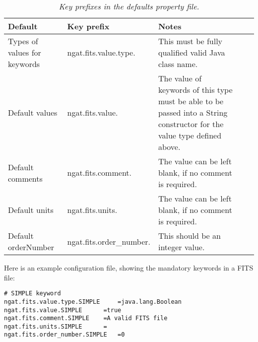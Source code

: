\documentclass[10pt,a4paper]{article}
\begin{document}
\begin{table}
\begin{center}
\begin{tabular}{|l|l|p{12em}|l|p{17em}|}
\hline
{\bf Default} 			& {\bf Key prefix} 	& {\bf Notes} \\ \hline
Types of values for keywords	& ngat.fits.value.type. & This must be fully qualified valid Java class name. \\ \hline
Default values 			& ngat.fits.value. 	& The value of keywords of this type must be able to be 
					passed into a String constructor for the value type defined above. \\ \hline
Default comments 		& ngat.fits.comment. 	& The value can be left blank, 
							if no comment is required. \\ \hline
Default units 			& ngat.fits.units. 	& The value can be left blank, 
							if no comment is required. \\ \hline
Default orderNumber 		& ngat.fits.order\_number. & This should be an integer value. \\ \hline
\end{tabular}
\end{center}
\caption{\em Key prefixes in the defaults property file.}
\label{tab:defaultkeyprefix} 
\end{table}

Here is an example configuration file, showing the mandatory keywords in a FITS file:

\begin{verbatim}
# SIMPLE keyword
ngat.fits.value.type.SIMPLE 	=java.lang.Boolean
ngat.fits.value.SIMPLE 		=true
ngat.fits.comment.SIMPLE	=A valid FITS file
ngat.fits.units.SIMPLE		=
ngat.fits.order_number.SIMPLE	=0

# BITPIX keyword
ngat.fits.value.type.BITPIX	=java.lang.Integer
ngat.fits.value.BITPIX 		=16
ngat.fits.comment.BITPIX	=Bits per pixel
ngat.fits.units.BITPIX		=bits
ngat.fits.order_number.BITPIX	=1

# NAXIS keyword
ngat.fits.value.type.NAXIS	=java.lang.Integer
ngat.fits.value.NAXIS 		=2
ngat.fits.comment.NAXIS		=Number of axes
ngat.fits.units.NAXIS		=
ngat.fits.order_number.NAXIS	=2

# NAXIS1 keyword
ngat.fits.value.type.NAXIS1 	=java.lang.Integer
ngat.fits.value.NAXIS1 		=
ngat.fits.comment.NAXIS1	=
ngat.fits.units.NAXIS1		=pixels
ngat.fits.order_number.NAXIS1	=3

# NAXIS2 keyword
ngat.fits.value.type.NAXIS2 	=java.lang.Integer
ngat.fits.value.NAXIS2		=
ngat.fits.comment.NAXIS2	=
ngat.fits.units.NAXIS2		=pixels
ngat.fits.order_number.NAXIS2	=4
\end{verbatim}
\end{document}
